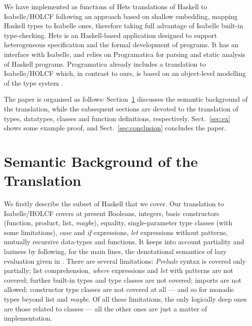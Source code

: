 \documentclass{llncs}
\begin{document}
We have implemented as functions of Hets translations of Haskell to
Isabelle/HOLCF following an approach based on shallow embedding,
mapping Haskell types to Isabelle ones, therefore taking full
advantage of Isabelle built-in type-checking. Hets
\cite{MossaTh,HetsUG,Hets,MossakowskiEtAl07b} is an Haskell-based
application designed to support heterogeneous specification and the
formal development of programs. It has an interface with Isabelle, and
relies on Programatica \cite{Prog04} for parsing and static analysis
of Haskell programs.  Programatica already includes a translation to
Isabelle/HOLCF which, in contrast to ours, is based on an object-level
modelling of the type system \cite{Huff}.

The paper is organised as follows: Section~\ref{sec:semantics} discusses
the semantic background of the translation, while the subsequent sections
are devoted to the translation of types, datatypes, classes and function
definitions, respectively. Sect.~\ref{sec:ex} shows some example proof,
and Sect.~\ref{sec:conclusion} concludes the paper.


\section{Semantic Background of the Translation}
\label{sec:semantics}

We firstly describe the subset of Haskell that we cover.
Our translation to Isabelle/HOLCF covers at present Booleans, integers, basic
constructors (function, product, list, \emph{maybe}), equality,
single-parameter type classes (with some limitations), \emph{case} and
\emph{if} expressions, \emph{let} expressions without patterns, mutually
recursive data-types and functions. 
It keeps into account partiality and laziness by
following, for the main lines, the denotational semantics of lazy evaluation
given in \cite{winskel}. There are several limitations: \emph{Prelude} syntax
is covered only partially; list comprehension, \emph{where} expressions and
\emph{let} with patterns are not covered; further built-in types and type
classes are not covered; imports are not allowed; constructor type classes are
not covered at all --- and so for monadic types beyond list and \emph{maybe}.
Of all these limitations, the only logically deep ones are those related to
classes --- all the other ones are just a matter of implementation.
\end{document}
